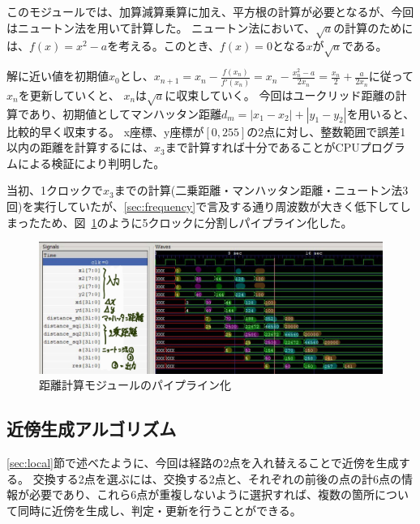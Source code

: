 このモジュールでは、加算減算乗算に加え、平方根の計算が必要となるが、今回はニュートン法を用いて計算した。
ニュートン法において、$\sqrt{a}$の計算のためには、$f(x)=x^2-a$を考える。このとき、$f(x)=0$となる$x$が$\sqrt{a}$である。

解に近い値を初期値$x_0$とし、$x_{n+1}=x_n-\frac{f(x_n)}{f'(x_n)}=x_n-\frac{x_n^2-a}{2x_n}=\frac{x_n}{2}+\frac{a}{2x_n}$に従って$x_n$を更新していくと、
$x_n$は$\sqrt{a}$に収束していく。
今回はユークリッド距離の計算であり、初期値としてマンハッタン距離$d_m=|x_1-x_2|+|y_1-y_2|$を用いると、比較的早く収束する。
x座標、y座標が$[0,255]$の2点に対し、整数範囲で誤差1以内の距離を計算するには、$x_3$まで計算すれば十分であることがCPUプログラムによる検証により判明した。

当初、1クロックで$x_3$までの計算(二乗距離・マンハッタン距離・ニュートン法3回)を実行していたが、\ref{sec:frequency}で言及する通り周波数が大きく低下してしまったため、図~\ref{fig:distance}のように5クロックに分割しパイプライン化した。

\begin{figure}[h]
    \begin{center}
        \includegraphics[width=15cm]{figure/distance_newton.jpg}
        \caption{距離計算モジュールのパイプライン化}\label{fig:distance}
    \end{center}
\end{figure}

\subsection{近傍生成アルゴリズム}
\ref{sec:local}節で述べたように、今回は経路の2点を入れ替えることで近傍を生成する。
交換する2点を選ぶには、交換する2点と、それぞれの前後の点の計6点の情報が必要であり、これら6点が重複しないように選択すれば、複数の箇所について同時に近傍を生成し、判定・更新を行うことができる。

